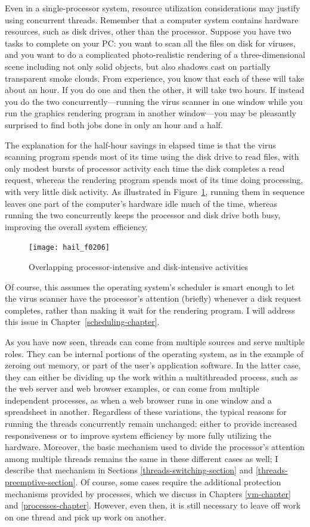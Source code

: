 Even in a single-processor system, resource utilization considerations
may justify using concurrent threads.  Remember that a computer
system contains hardware resources, such as
disk drives, other than the processor. Suppose you have two tasks to complete on your PC: you
want to scan all the files on disk for viruses, and you want to do a
complicated photo-realistic rendering of a three-dimensional scene
including not only solid objects, but also shadows cast on
partially transparent smoke clouds.  From experience, you know
that each of these will take about an hour.  If you do one and then
the other, it will take two hours.  If instead you do the two
concurrently---running the virus scanner in one window while you run
the graphics rendering program in another window---you may be
pleasantly surprised to find both jobs done in only an hour and a half.

The explanation for the half-hour savings in elapsed time is that the virus scanning program spends most
of its time using the disk drive to read files, with only modest
bursts of processor activity each time the disk completes a read
request, whereas the rendering program spends most of its time doing
processing, with very little disk activity.  As illustrated in Figure~\ref{scan-2-4}, running them in
sequence leaves one part of the computer's hardware idle much of the time,
whereas running the two concurrently keeps the processor and disk
drive both busy, improving the overall system efficiency.
\begin{figure}
\centerline{\texttt{[image: hail\_f0206]}}
\caption{Overlapping processor-intensive and disk-intensive activities}
\label{scan-2-4}
\end{figure}
Of course,
this assumes the operating system's scheduler is smart enough to let
the virus scanner have the processor's attention (briefly) whenever a
disk request completes, rather than making it wait for the rendering
program.  I will address this issue in Chapter~\ref{scheduling-chapter}.

As you have now seen, threads can come from multiple sources and serve
multiple roles.  They can be internal portions of the operating
system, as in the example of zeroing out memory, or part of the user's
application software.  In the latter case, they can either be dividing
up the work within a multithreaded process, such as the web server
and web browser examples, or can come from multiple independent
processes, as when a web browser runs in one window and a spreadsheet
in another.  Regardless of these variations, the typical reasons
for running the threads concurrently remain unchanged: either to provide
increased responsiveness or to improve system efficiency by more fully
utilizing the hardware.  Moreover, the basic mechanism used to divide
the processor's attention among multiple threads remains the same in
these different cases as well; I describe that mechanism in Sections
\ref{threads-switching-section} and \ref{threads-preemptive-section}.
Of course, some cases require the additional protection mechanisms
provided by processes,
which we discuss in Chapters \ref{vm-chapter} and
\ref{processes-chapter}.  However, even then, it is still necessary to
leave off work on one thread and pick up work on another.

